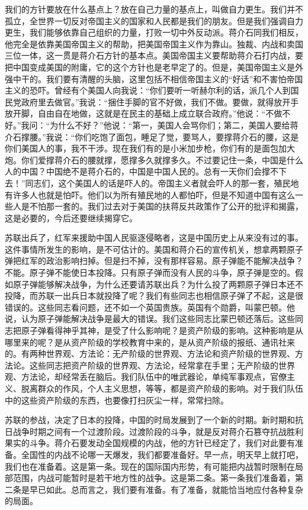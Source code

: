 我们的方针要放在什么基点上？放在自己力量的基点上，叫做自力更生。我们并不孤立，全世界一切反对帝国主义的国家和人民都是我们的朋友。但是我们强调自力更生，我们能够依靠自己组织的力量，打败一切中外反动派。蒋介石同我们相反，他完全是依靠美国帝国主义的帮助，把美国帝国主义作为靠山。独裁、内战和卖国三位一体，这一贯是蒋介石方针的基本点。美国帝国主义要帮助蒋介石打内战，要把中国变成美国的附庸，它的这个方针也是老早定了的。但是，美国帝国主义是外强中干的。我们要有清醒的头脑，这里包括不相信帝国主义的“好话”和不害怕帝国主义的恐吓。曾经有个美国人向我说：“你们要听一听赫尔利的话，派几个人到国民党政府里去做官。”我说：“捆住手脚的官不好做，我们不做。要做，就得放开手放开脚，自由自在地做，这就是在民主的基础上成立联合政府。”他说：“不做不好。”我问：“为什么不好？”他说：“第一，美国人会骂你们；第二，美国人要给蒋介石撑腰。”我说：“你们吃饱了面包，睡足了觉，要骂人，要撑蒋介石的腰，这是你们美国人的事，我不干涉。现在我们有的是小米加步枪，你们有的是面包加大炮。你们爱撑蒋介石的腰就撑，愿撑多久就撑多久。不过要记住一条，中国是什么人的中国？中国绝不是蒋介石的，中国是中国人民的。总有一天你们会撑不下去！”同志们，这个美国人的话是吓人的。帝国主义者就会吓人的那一套，殖民地有许多人也就是怕吓。他们以为所有殖民地的人都怕吓，但是不知道中国有这么一些人是不怕那一套的。我们过去对于美国的扶蒋反共政策作了公开的批评和揭露，这是必要的，今后还要继续揭穿它。

苏联出兵了，红军来援助中国人民驱逐侵略者，这是中国历史上从来没有过的事。这件事情所发生的影响，是不可估计的。美国和蒋介石的宣传机关，想拿两颗原子弹把红军的政治影响扫掉。但是扫不掉，没有那样容易。原子弹能不能解决战争？不能。原子弹不能使日本投降。只有原子弹而没有人民的斗争，原子弹是空的。假如原子弹能够解决战争，为什么还要请苏联出兵？为什么投了两颗原子弹日本还不投降，而苏联一出兵日本就投降了呢？我们有些同志也相信原子弹了不起，这是很错误的。这些同志看问题，还不如一个英国贵族。英国有个勋爵，叫蒙巴顿。他说，认为原子弹能解决战争是最大的错误。我们这些同志比蒙巴顿还落后。这些同志把原子弹看得神乎其神，是受了什么影响呢？是资产阶级的影响。这种影响是从哪里来的呢？是从资产阶级的学校教育中来的，是从资产阶级的报纸、通讯社来的。有两种世界观、方法论：无产阶级的世界观、方法论和资产阶级的世界观、方法论。这些同志把资产阶级的世界观、方法论，经常拿在手里；无产阶级的世界观、方法论，却经常丢在脑后。我们队伍中的唯武器论，单纯军事观点，官僚主义、脱离群众的作风，个人主义思想，等等，都是资产阶级的影响。对于我们队伍中的这些资产阶级的东西，也要像打扫灰尘一样，常常扫除。

苏联的参战，决定了日本的投降，中国的时局发展到了一个新的时期。新时期和抗日战争时期之间有一个过渡阶段。过渡阶段的斗争，就是反对蒋介石篡夺抗战胜利果实的斗争。蒋介石要发动全国规模的内战，他的方针已经定了，我们对此要有准备。全国性的内战不论哪一天爆发，我们都要准备好。早一点，明天早上就打吧，我们也在准备着。这是第一条。现在的国际国内形势，有可能把内战暂时限制在局部范围，内战可能暂时是若干地方性的战争。这是第二条。第一条我们准备着，第二条是早已如此。总而言之，我们要有准备。有了准备，就能恰当地应付各种复杂的局面。


